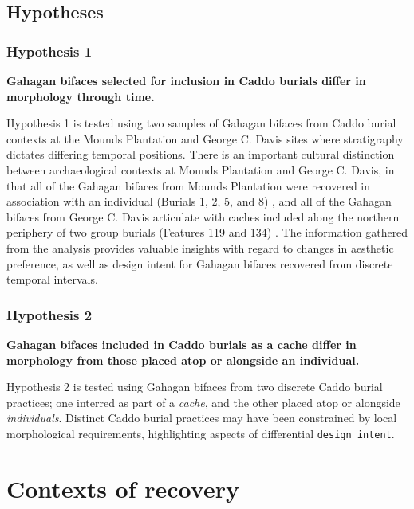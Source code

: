 \documentclass[]{interact}
\theoremstyle{plain}%
\theoremstyle{definition}
\theoremstyle{remark}
\begin{document}
\hypertarget{hypotheses}{%
\subsection{Hypotheses}\label{hypotheses}}

\hypertarget{hypothesis-1}{%
\subsubsection{Hypothesis 1}\label{hypothesis-1}}

\textbf{Gahagan bifaces selected for inclusion in Caddo burials differ
in morphology through time.}

Hypothesis 1 is tested using two samples of Gahagan bifaces from Caddo
burial contexts at the Mounds Plantation and George C. Davis sites where
stratigraphy dictates differing temporal positions. There is an
important cultural distinction between archaeological contexts at Mounds
Plantation and George C. Davis, in that all of the Gahagan bifaces from
Mounds Plantation were recovered in association with an individual
(Burials 1, 2, 5, and 8) \citep{RN8174}, and all of the Gahagan bifaces
from George C. Davis articulate with caches included along the northern
periphery of two group burials (Features 119 and 134)
\citep{RN5746,RN8186}. The information gathered from the analysis
provides valuable insights with regard to changes in aesthetic
preference, as well as design intent for Gahagan bifaces recovered from
discrete temporal intervals.

\hypertarget{hypothesis-2}{%
\subsubsection{Hypothesis 2}\label{hypothesis-2}}

\textbf{Gahagan bifaces included in Caddo burials as a cache differ in
morphology from those placed atop or alongside an individual.}

Hypothesis 2 is tested using Gahagan bifaces from two discrete Caddo
burial practices; one interred as part of a \emph{cache}, and the other
placed atop or alongside \emph{individuals}. Distinct Caddo burial
practices may have been constrained by local morphological requirements,
highlighting aspects of differential \texttt{design\ intent}.

\hypertarget{contexts-of-recovery}{%
\section{Contexts of recovery}\label{contexts-of-recovery}}
\end{document}
